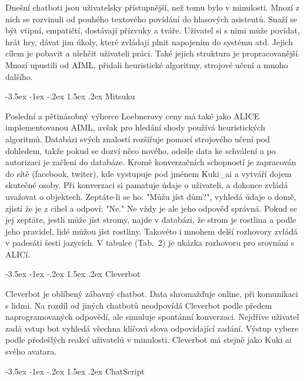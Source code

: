\documentclass[a4paper,10pt]{article}
\makeatletter
\theoremstyle{definition}
\renewcommand\subsection{\@startsection {subsection}{1}{\z@}%
                                   {-3.5ex \@plus -1ex \@minus -.2ex}%
                                   {1.5ex \@plus.2ex}%
                                   {\normalsize\bfseries}}
\makeatother
\begin{document}
Dnešní chatboti jsou uživatelsky přístupnější, než tomu bylo v minulosti. Mnozí z nich se rozvinuli od pouhého textového povídání do hlasových asistentů. Snaží se být vtipní, empatičtí, dostávají přízvuky a tváře. Uživatel si s nimi může povídat, hrát hry, dávat jim úkoly, které zvládají plnit napojením do systému atd. Jejich cílem je pobavit a ulehčit uživateli práci.
Také jejich struktura je propracovanější. Mnozí upustili od AIML, přidali heuristické algoritmy, strojové učení a mnoho dalšího. \cite{1}

\subsection{Mitsuku}
\label{subsec:1}


Poslední a pětinásobný výherce Loebnerovy ceny má také jako ALICE implementovanou AIML, avšak pro hledání shody používá heuristických algoritmů. Databázi svých znalostí rozšiřuje pomocí strojového učení pod dohledem, takže pokud se dozví něco nového, odešle data ke schválení a po autorizaci je začlení do databáze. Kromě konverzačních schopností je zapracován do sítě (facebook, twiter), kde vystupuje pod jménem Kuki\_ai a vytváří dojem skutečné osoby. Při konverzaci si pamatuje údaje o uživateli, a dokonce zvládá uvažovat o objektech. Zeptáte-li se ho: "Můžu jíst dům?", vyhledá údaje o domě, zjistí že je z cihel a odpoví: "Ne." Ne vždy je ale jeho odpověď správná. Pokud se jej zeptáte, jestli může jíst stromy, najde v databázi, že strom je rostlina a podle jeho pravidel, lidé můžou jíst rostliny. Takovéto i mnohem delší rozhovory zvládá v padesáti šesti jazycích. V tabulce (Tab.~2) je ukázka rozhovoru pro srovnání s ALICí.

\subsection{Cleverbot}
\label{subsec:2}

Cleverbot je oblíbený zábavný chatbot. Data shromažďuje online, při komunikaci s lidmi. Na rozdíl od jiných chatbotů neodpovídá Cleverbot podle předem naprogramovaných odpovědí, ale simuluje spontánní konverzaci. Nejdříve uživatel zadá vstup bot vyhledá všechna klíčová slova odpovídající zadání. Výstup vybere podle předešlých reakcí uživatelů v minulosti. Cleverbot má stejně jako Kuki ai svého avatara.

\subsection{ChatScript}
\label{subsec:3}
\end{document}
